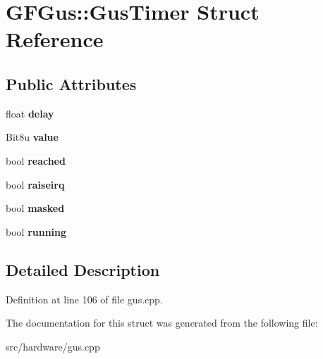 \hypertarget{structGFGus_1_1GusTimer}{\section{G\-F\-Gus\-:\-:Gus\-Timer Struct Reference}
\label{structGFGus_1_1GusTimer}
}
\subsection*{Public Attributes}
\begin{DoxyCompactItemize}
\item 
\hypertarget{structGFGus_1_1GusTimer_aee952ea33d779a230a2652b5b7a0cac8}{float {\bfseries delay}}\label{structGFGus_1_1GusTimer_aee952ea33d779a230a2652b5b7a0cac8}

\item 
\hypertarget{structGFGus_1_1GusTimer_a31a1f93f014d45aef3fd61d0d5667481}{Bit8u {\bfseries value}}\label{structGFGus_1_1GusTimer_a31a1f93f014d45aef3fd61d0d5667481}

\item 
\hypertarget{structGFGus_1_1GusTimer_aef9e1ea5deb2d585b7f15eb62a89de85}{bool {\bfseries reached}}\label{structGFGus_1_1GusTimer_aef9e1ea5deb2d585b7f15eb62a89de85}

\item 
\hypertarget{structGFGus_1_1GusTimer_a4425a248a4b43b178b279f5a3e8a169c}{bool {\bfseries raiseirq}}\label{structGFGus_1_1GusTimer_a4425a248a4b43b178b279f5a3e8a169c}

\item 
\hypertarget{structGFGus_1_1GusTimer_ac033ff5008998588554e9319437e68a0}{bool {\bfseries masked}}\label{structGFGus_1_1GusTimer_ac033ff5008998588554e9319437e68a0}

\item 
\hypertarget{structGFGus_1_1GusTimer_a0cb384d64010c79f0a588b0ec81968e6}{bool {\bfseries running}}\label{structGFGus_1_1GusTimer_a0cb384d64010c79f0a588b0ec81968e6}

\end{DoxyCompactItemize}


\subsection{Detailed Description}


Definition at line 106 of file gus.\-cpp.



The documentation for this struct was generated from the following file\-:\begin{DoxyCompactItemize}
\item 
src/hardware/gus.\-cpp\end{DoxyCompactItemize}
